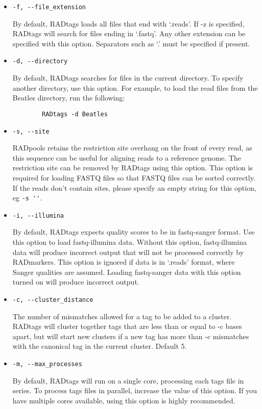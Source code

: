 \documentclass[a4paper]{article}
\begin{document}
\begin{itemize}
    \item \verb|-f, --file_extension|
    
    By default, RADtags loads all files that end with `.reads'. If -z is specified, RADtags will search for files ending in `.fastq'. Any other extension can be specified with this option. Separators such as `.' must be specified if present.
    
    \item \verb|-d, --directory|
    
    By default, RADtags searches for files in the current directory. To specify another directory, use this option. For example, to load the read files from the Beatles directory, run the following:
    
    \begin{verbatim}
        RADtags -d Beatles
    \end{verbatim}
    
    \item \verb|-s, --site|
    
    RADpools retains the restriction site overhang on the front of every read, as this sequence can be useful for aligning reads to a reference genome. The restriction site can be removed by RADtags using this option. This option is required for loading FASTQ files so that FASTQ files can be sorted correctly. If the reads don't contain sites, please specify an empty string for this option, eg \verb|-s ''|.

    \item \verb|-i, --illumina|
    
    By default, RADtags expects quality scores to be in fastq-sanger format. Use this option to load fastq-illumina data. Without this option, fastq-illumina data will produce incorrect output that will not be processed correctly by RADmarkers. This option is ignored if data is in `.reads' format, where Sanger qualities are assumed. Loading fastq-sanger data with this option turned on will produce incorrect output.
    
    \item \verb|-c, --cluster_distance|

    The number of mismatches allowed for a tag to be added to a cluster. RADtags will cluster together tags that are less than or equal to -c bases apart, but will start new clusters if a new tag has more than -c mismatches with the canonical tag in the current cluster. Default 5.

    \item \verb|-m, --max_processes|
    
    By default, RADtags will run on a single core, processing each tags file in series. To process tags files in parallel, increase the value of this option. If you have multiple cores available, using this option is highly recommended.

\end{itemize}
\end{document}
